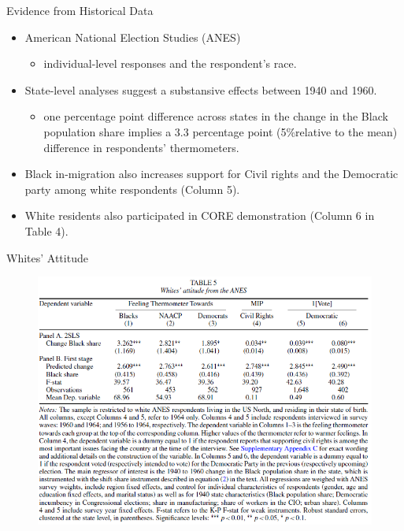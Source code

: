 \documentclass[dvipdfmx,11pt]{beamer}
\begin{document}
\begin{frame}{Evidence from Historical Data}
  \begin{itemize}
    \item American National Election Studies (ANES)
    \begin{itemize}
      \item individual-level responses and the respondent's race.
    \end{itemize}
    \item State-level analyses suggest a substansive effects between 1940 and 1960.
    \begin{itemize}
      \item one percentage point difference across states in the change in the Black population share implies a 3.3 percentage point (5\%relative to the mean) difference in respondents' thermometers.
    \end{itemize}
    \item Black in-migration also increases support for Civil rights and the Democratic party among white respondents (Column 5).
    \item White residents also participated in CORE demonstration (Column 6 in Table 4).
  \end{itemize}
\end{frame}

\begin{frame}{Whites' Attitude}
  \begin{figure}
    \centering
    \includegraphics[scale = .5]{fig_tab/os20220708/T5.png}
  \end{figure}
\end{frame}
\end{document}
